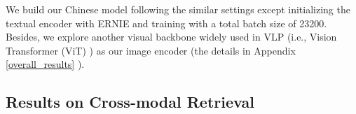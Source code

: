 \documentclass{article}
\begin{document}
We build our Chinese model following the similar settings except initializing the textual encoder with ERNIE \cite{sun2019ernie,sun2020ernie,sun2021ernie} and training with a total batch size of 23200. Besides, we explore another visual backbone widely used in VLP (i.e., Vision Transformer (ViT) \cite{dosovitskiy2021an}) as our image encoder (the details in Appendix \ref{overall_results} ).
\subsection{Results on Cross-modal Retrieval}
\label{Cross_modal_Retrieval}

\begin{table*}[]
\centering
{}
\end{table*}
\end{document}
